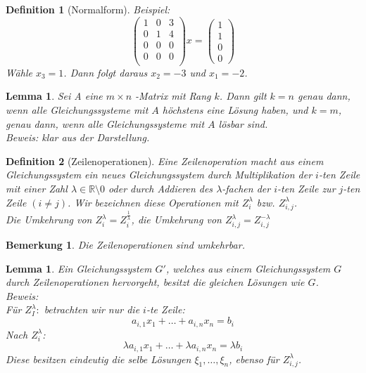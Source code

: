 \documentclass{report}
\newcommand{\lb}{\lambda}
\newcommand{\mlb}{$\lb$}
\newcommand{\R}{\mathbb{R}}
\theoremstyle{customrem}
\newtheorem*{bem}{Bemerkung}
\theoremstyle{customdef}
\newtheorem*{definition*}{Definition} %
\newtheorem{lem}[definition]{Lemma}
\begin{document}
\begin{definition*}[Normalform]
		\noindent Beispiel:
		$$
		\begin{pmatrix}
			1 & 0 & 3\\
			0 & 1 & 4\\
			0 & 0 & 0\\
			0 & 0 & 0\\
		\end{pmatrix} x =
		\begin{pmatrix}
			1\\1\\0\\0
		\end{pmatrix}
		$$
		Wähle $x_3 = 1$. Dann folgt daraus $x_2 = -3$ und $x_1 = -2$.
	\end{definition*}
	\begin{lem}
		Sei A eine $m\times n$ -Matrix mit Rang $k$. Dann gilt $k=n$  genau dann, wenn alle Gleichungssysteme mit $A$ höchstens eine Lösung haben, und $k = m$, genau dann, wenn alle Gleichungssysteme mit $A$ lösbar sind.\\
		Beweis: klar aus der Darstellung.
	\end{lem}
	\begin{definition*}[Zeilenoperationen]
		Eine Zeilenoperation macht aus einem Gleichungssystem ein neues Gleichungssystem durch Multiplikation  der $i$-ten Zeile mit einer Zahl $\lb \in \R \setminus 0$ oder durch Addieren des \mlb-fachen der $i$-ten Zeile zur $j$-ten Zeile $(i \neq j)$. Wir bezeichnen diese Operationen mit $Z_i^\lb$ bzw. $Z_{i,j}^\lb$.\\
		Die Umkehrung von $Z_i^\lb = Z_i^{\frac{1}{\lb}}$, die Umkehrung von $Z_{i,j}^\lb = Z_{i,j}^{-\lb}$
	\end{definition*}
	\begin{bem}
		Die Zeilenoperationen sind umkehrbar.
	\end{bem}
	\begin{lem}
		Ein Gleichungssystem $G'$, welches aus einem Gleichungssystem $G$ durch Zeilenoperationen hervorgeht, besitzt die gleichen Lösungen wie $G$.\\
		Beweis:\\
		Für $Z_I^\lb: $ betrachten wir nur die $i$-te Zeile:
		$$a_{i,1}x_1 + \dots + a_{i,n}x_n = b_i$$
		Nach $Z_i^\lb$:
		$$\lb a_{i,1}x_1 + \dots + \lb a_{i,n}x_n = \lb b_i$$
		Diese besitzen eindeutig die selbe Lösungen $\xi_1, \dots, \xi_n$, ebenso für $Z_{i,j}^\lb$.
	\end{lem}
\end{document}
